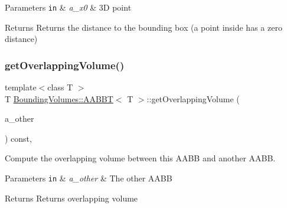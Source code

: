 \begin{DoxyParams}[1]{Parameters}
\mbox{\tt in}  & {\em a\+\_\+x0} & 3D point \\
\hline
\end{DoxyParams}
\begin{DoxyReturn}{Returns}
Returns the distance to the bounding box (a point inside has a zero distance) 
\end{DoxyReturn}
\mbox{\label{classBoundingVolumes_1_1AABBT_ae65563ac6f3851f8fb05e0c98613fc0d}} 
\subsubsection{\texorpdfstring{get\+Overlapping\+Volume()}{getOverlappingVolume()}}
{\footnotesize\ttfamily template$<$class T $>$ \\
T \hyperlink{classBoundingVolumes_1_1AABBT}{Bounding\+Volumes\+::\+A\+A\+B\+BT}$<$ T $>$\+::get\+Overlapping\+Volume (\begin{DoxyParamCaption}\item[{const \hyperlink{classBoundingVolumes_1_1AABBT}{A\+A\+B\+BT}$<$ T $>$ \&}]{a\+\_\+other }\end{DoxyParamCaption}) const\hspace{0.3cm}{\ttfamily [inline]}, {\ttfamily [noexcept]}}



Compute the overlapping volume between this A\+A\+BB and another A\+A\+BB. 


\begin{DoxyParams}[1]{Parameters}
\mbox{\tt in}  & {\em a\+\_\+other} & The other A\+A\+BB \\
\hline
\end{DoxyParams}
\begin{DoxyReturn}{Returns}
Returns overlapping volume 
\end{DoxyReturn}
\mbox{\label{classBoundingVolumes_1_1AABBT_a87d160a3e05082e34e37d8b4472bad7d}} 
